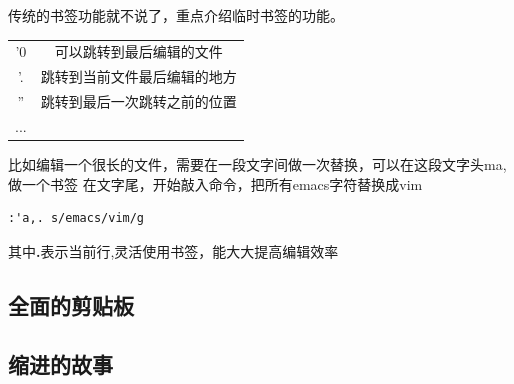 \documentclass[adobefonts]{ctexart}
\begin{document}
传统的书签功能就不说了，重点介绍临时书签的功能。

\begin{tabular}{c c}
'0  &  可以跳转到最后编辑的文件               \\
'.  &  跳转到当前文件最后编辑的地方           \\
''  &  跳转到最后一次跳转之前的位置           \\
...
\end{tabular}

比如编辑一个很长的文件，需要在一段文字间做一次替换，可以在这段文字头ma,做一个书签
在文字尾，开始敲入命令，把所有emacs字符替换成vim
\begin{verbatim}
:'a,. s/emacs/vim/g 
\end{verbatim}

其中\textbf{.}表示当前行,灵活使用书签，能大大提高编辑效率

\subsection{全面的剪贴板}
\subsection{缩进的故事}


\end{document}
